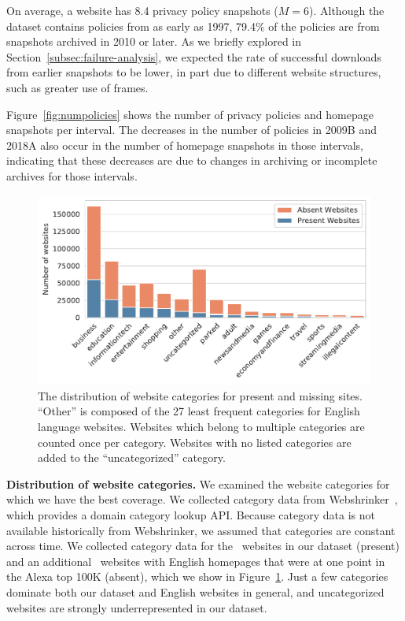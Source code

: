 On average, a website has 8.4 privacy policy snapshots ($M=6$). Although the dataset contains policies from as early as 1997, 79.4\% of the policies are from snapshots archived in 2010 or later.
As we briefly explored in Section~\ref{subsec:failure-analysis}, we expected the rate of successful downloads from earlier snapshots to be lower, in part due to different website structures, such as greater use of frames.

Figure~\ref{fig:numpolicies} shows the number of privacy policies and homepage snapshots per interval.
The decreases in the number of policies in 2009B and 2018A also occur in the number of homepage snapshots in those intervals, indicating that these decreases are due to changes in archiving or incomplete archives for those intervals.

\begin{figure}[t]
\centering
\includegraphics[width=1\columnwidth]{figures/category_dist.pdf}

\caption{The distribution of website categories for present and missing sites. ``Other'' is composed of the 27 least frequent categories for English language websites. Websites which belong to multiple categories are counted once per category. Websites with no listed categories are added to the ``uncategorized'' category.}
\label{fig:cat_dist}
\end{figure}

{\textbf{Distribution of website categories.}}
We examined the website categories for which we have the best coverage. We collected category data from Webshrinker~\cite{Webshrinker}, which provides a domain category lookup API.
Because category data is not available historically from Webshrinker, we assumed that categories are constant across time. We collected category data for the \numpresentdoms~websites in our dataset (present) and an additional \numabsentenglishdoms~websites with English homepages that were at one point in the Alexa top 100K (absent), which we show in Figure~\ref{fig:cat_dist}.
Just a few categories dominate both our dataset and English websites in general, and uncategorized websites are strongly underrepresented in our dataset.


